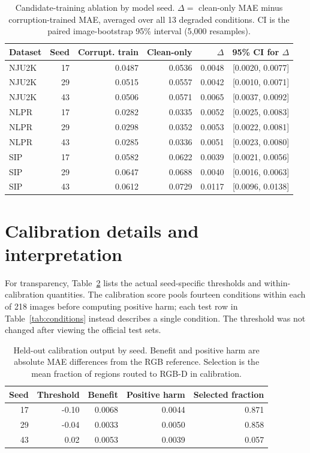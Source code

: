 \documentclass[11pt]{article}
\begin{document}
\begin{table}[htbp]\centering\small
\caption{Candidate-training ablation by model seed. $\Delta=$ clean-only MAE minus corruption-trained MAE, averaged over all 13 degraded conditions. CI is the paired image-bootstrap 95\% interval (5,000 resamples).}
\label{tab:seedablation}
\begin{tabular}{lrrrrr}\toprule Dataset & Seed & Corrupt. train & Clean-only & $\Delta$ & 95\% CI for $\Delta$\\\midrule
NJU2K & 17 & 0.0487 & 0.0536 & 0.0048 & [0.0020, 0.0077]\\
NJU2K & 29 & 0.0515 & 0.0557 & 0.0042 & [0.0010, 0.0071]\\
NJU2K & 43 & 0.0506 & 0.0571 & 0.0065 & [0.0037, 0.0092]\\
NLPR & 17 & 0.0282 & 0.0335 & 0.0052 & [0.0025, 0.0083]\\
NLPR & 29 & 0.0298 & 0.0352 & 0.0053 & [0.0022, 0.0081]\\
NLPR & 43 & 0.0285 & 0.0336 & 0.0051 & [0.0023, 0.0080]\\
SIP & 17 & 0.0582 & 0.0622 & 0.0039 & [0.0021, 0.0056]\\
SIP & 29 & 0.0647 & 0.0688 & 0.0040 & [0.0016, 0.0063]\\
SIP & 43 & 0.0612 & 0.0729 & 0.0117 & [0.0096, 0.0138]\\
\bottomrule\end{tabular}
\end{table}

\section{Calibration details and interpretation}
For transparency, Table~\ref{tab:calibration} lists the actual seed-specific thresholds and within-calibration quantities. The calibration score pools fourteen conditions within each of 218 images before computing positive harm; each test row in Table~\ref{tab:conditions} instead describes a single condition. The threshold was not changed after viewing the official test sets.

\begin{table}[htbp]\centering\small
\caption{Held-out calibration output by seed. Benefit and positive harm are absolute MAE differences from the RGB reference. Selection is the mean fraction of regions routed to RGB-D in calibration.}
\label{tab:calibration}
\begin{tabular}{rrrrr}\toprule Seed & Threshold & Benefit & Positive harm & Selected fraction\\\midrule
17 & -0.10 & 0.0068 & 0.0044 & 0.871\\
29 & -0.04 & 0.0033 & 0.0050 & 0.858\\
43 & 0.02 & 0.0053 & 0.0039 & 0.057\\
\bottomrule\end{tabular}
\end{table}
\end{document}
